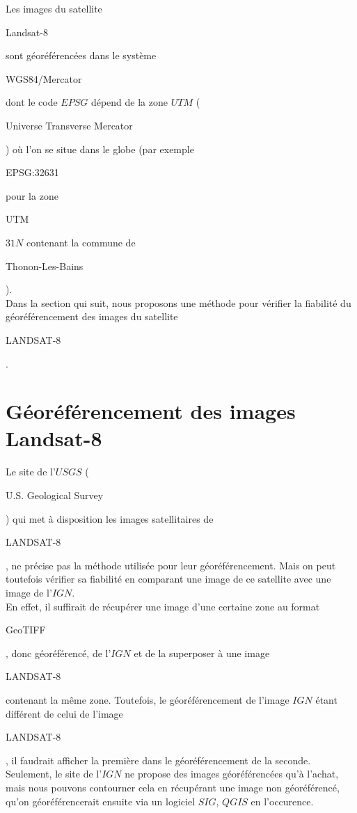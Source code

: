 \documentclass{book}
\begin{document}
Les images du satellite \begin{itshape}Landsat-8\end{itshape} sont géoréférencées dans le système 
\begin{itshape}WGS84/Mercator\end{itshape} dont le code $EPSG$ dépend
de la zone $UTM$ (\begin{itshape}Universe Transverse Mercator\end{itshape}) où l'on se situe dans le globe 
(par exemple \begin{itshape}EPSG:32631\end{itshape} pour la zone \begin{itshape}UTM\end{itshape} $31N$ contenant la commune de
 \begin{itshape}Thonon-Les-Bains\end{itshape}).\\ 
Dans la section qui suit, nous proposons une méthode pour vérifier la fiabilité du géoréférencement
 des images du satellite \begin{itshape}LANDSAT-8\end{itshape}.
 
\section{Géoréférencement des images Landsat-8}

Le site de l'$USGS$ (\begin{itshape}U.S. Geological Survey\end{itshape}) \cite{landsat8} qui met à disposition les images
satellitaires de \begin{itshape}LANDSAT-8\end{itshape}, ne précise pas la méthode utilisée pour leur géoréférencement.
Mais on peut toutefois vérifier sa fiabilité en comparant une image de ce satellite avec une image de 
l'$IGN$.\\
En effet, il suffirait de récupérer une image d'une certaine zone au format \begin{itshape}GeoTIFF\end{itshape}, 
donc géoréférencé, de l'$IGN$ et de la superposer
à une image \begin{itshape}LANDSAT-8\end{itshape} contenant la même zone. Toutefois, le géoréférencement de l'image $IGN$ étant différent
de celui de l'image \begin{itshape}LANDSAT-8\end{itshape}, il faudrait afficher la première dans le géoréférencement de la seconde.\\
Seulement, le site de l'$IGN$ ne propose des images géoréférencées qu'à l'achat, mais nous pouvons contourner cela en récupérant une 
image non géoréférencé, qu'on géoréférencerait ensuite via un logiciel $SIG$, $QGIS$ en l'occurence.
\end{document}
